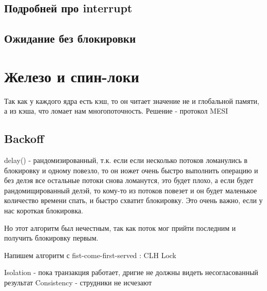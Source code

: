 \documentclass[10pt,a4paper,oneside,titlepage]{article}
\theoremstyle{plain}
\theoremstyle{defenition}
\begin{document}
\subsection{Подробней про interrupt}

\subsection{Ожидание без блокировки}

\section{Железо и спин-локи}
Так как у каждого ядра есть кэш, то он читает значение не и глобальной памяти, а из кэша, что ломает нам многопоточность. Решение - протокол MESI

\subsection{Backoff}
delay() - рандомизированный, т.к. если если несколько потоков ломанулись в блокировку и одному повезло, то он иожет очень быстро выполнить операцию и без делэя все остальные потоки снова ломанутся, это будет плохо, а если будет рандомищированный делэй, то кому-то из потоков повезет и он будет маленькое количество времени спать, и быстро схватит блокировку. Это очень важно, если у нас короткая блокировка.

Но этот алгоритм был нечестным, так как поток мог прийти последним и получить блокировку первым.

Напишем алгоритм с fist-come-first-served : CLH Lock

Isolation - пока транзакция работает, дригие не должны видеть несогласованный результат
Consistency - струдники не исчезают
\end{document}
